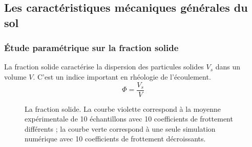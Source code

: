 \documentclass[a4paper,12pt]{report}
\begin{document}


\subsection{Les caractéristiques mécaniques générales du sol}

\subsubsection{Étude paramétrique sur la fraction solide}

La fraction solide caractérise la dispersion des particules solides $V_s$ dans un volume $V$.  
C'est un indice important en rhéologie de l'écoulement.  
\begin{equation}
\Phi = \dfrac{V_s}{V}
\end{equation}

\begin{figure}[h!]
    \centering
    \scalebox{0.5}{}
    \caption{La fraction solide. La courbe violette correspond à la moyenne expérimentale de 10 échantillons avec 10 coefficients de frottement différents ; la courbe verte correspond à une seule simulation numérique avec 10 coefficients de frottement décroissants.}
    \label{fig:fractionSolideMax}
\end{figure}
\end{document}
